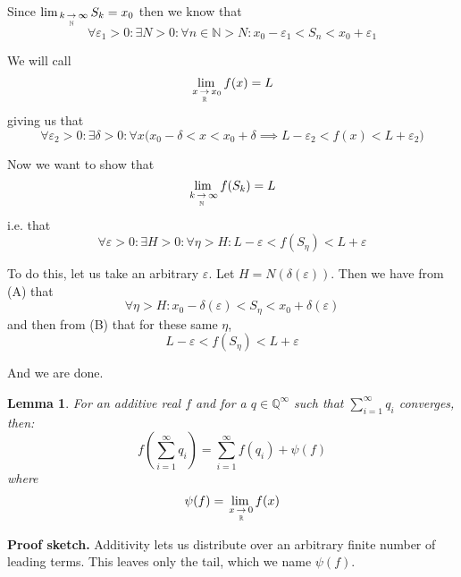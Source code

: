 \documentclass{article}
\theoremstyle{mytheoremstyle}
\newtheorem{lemma}{Lemma}
\renewenvironment{proof}[1][\proofname]{\noindent{\bfseries #1. }}{\begin{flushright}\smiley\end{flushright}}
\newcommand{\sketch}{\noindent\textbf{Proof sketch.} }
\newcommand{\R}{\mathbb R}
\newcommand{\N}{\mathbb Z}
\renewcommand{\N}{\mathbb N}
\begin{document}
\begin{proof}
Since $\limx{\N}{k}{\infty} S_k = x_0$ then we know that
\[ \forall \varepsilon_1 > 0 : \exists N > 0 : \forall n \in \N > N : x_0 - \varepsilon_1 < S_n < x_0 + \varepsilon_1 \tag{A} \]

We will call
$$ \limx{\R}{x}{x_0} f(x) = L $$
giving us that
\[ \forall \varepsilon_2 > 0 : \exists \delta > 0 : \forall x \bigg(x_0 - \delta < x < x_0 + \delta \implies L - \varepsilon_2 < f(x) < L + \varepsilon_2 \bigg) \tag{B} \]

Now we want to show that
$$ \limx{\N}{k}{\infty} f(S_k) = L $$
i.e. that
$$ \forall \varepsilon > 0 : \exists H > 0 : \forall \eta > H : L - \varepsilon < f(S_\eta) < L + \varepsilon $$

To do this, let us take an arbitrary $\varepsilon$. Let $H = N(\delta(\varepsilon))$. Then we have from (A) that
$$ \forall \eta > H : x_0 - \delta(\varepsilon) < S_\eta < x_0 + \delta(\varepsilon) $$
and then from (B) that for these same $\eta$,
$$ L - \varepsilon < f(S_\eta) < L + \varepsilon $$

And we are done.
\end{proof}


\begin{lemma}
\label{lemma:psi}
For an additive real $f$ and for a $q \in \mathbb Q ^\infty$ such that $\sum_{i=1}^\infty q_i$ converges, then:
$$ f\left( \sum_{i = 1}^\infty q_i \right) = \sum_{i=1}^\infty f(q_i) + \psi(f) $$
where
$$ \psi(f) = \limx{\R}{x}{0} f(x) $$
\end{lemma}

\sketch Additivity lets us distribute over an arbitrary finite number of leading terms. This leaves only the tail, which we name $\psi(f)$.
\end{document}
